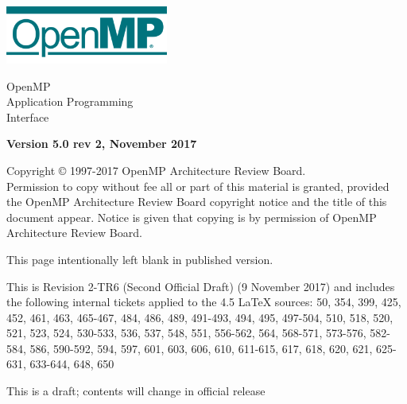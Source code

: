 
  \begin{titlepage}
    \begin{flushleft}
     \hspace{-6em} \includegraphics[width=0.4\textwidth]{openmp-logo.png}
    \end{flushleft}

    \begin{adjustwidth}{-0.75in}{0in}
    \begin{center}
      \Huge
      \textsf{OpenMP\\Application Programming\\Interface}

      \vspace{0.5in}\textsf{    }\vspace{-0.7in}
      \normalsize

      \vspace{1.0in}

      \textbf{Version 5.0 rev 2, November 2017}
    \end{center}
    \end{adjustwidth}

    \vspace{3.0in}

\begin{adjustwidth}{0pt}{1em}\setlength{\parskip}{0.25\baselineskip}%
Copyright © 1997-2017 OpenMP Architecture Review Board.\\
Permission to copy without fee all or part of this material is granted,
provided the OpenMP Architecture Review Board copyright notice and
the title of this document appear. Notice is given that copying is by
permission of OpenMP Architecture Review Board.\end{adjustwidth}

  \end{titlepage}


\clearpage
\thispagestyle{empty}
\phantom{a}
This page intentionally left blank in published version.

This is Revision 2-TR6 (Second Official Draft) (9 November 2017) and 
includes the following internal tickets applied to the 4.5 LaTeX sources: 
50, 354, 399, 425, 452, 461, 463, 465-467, 484, 486, 489, 491-493, 494, 
495, 497-504, 510, 518, 520, 521, 523, 524, 530-533, 536, 537, 548, 551, 
556-562, 564, 568-571, 573-576, 582-584, 586, 590-592, 594, 597, 601, 
603, 606, 610, 611-615, 617, 618, 620, 621, 625-631, 633-644, 648, 
650

This is a draft; contents will change in official release

\vfill

